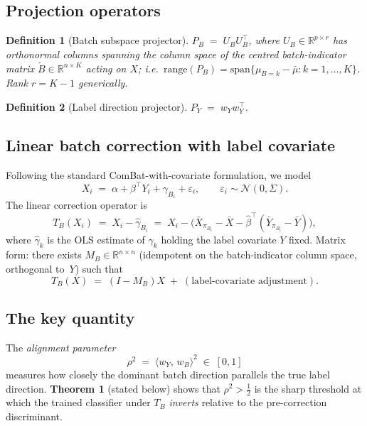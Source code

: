 \documentclass[11pt,a4paper]{article}
\newtheorem{definition}{Definition}
\begin{document}
\subsection{Projection operators}

\begin{definition}[Batch subspace projector]
  $P_B \;=\; U_B U_B^{\!\top}$, where $U_B\in\mathbb{R}^{p\times r}$
  has orthonormal columns spanning the column space of the centred
  batch-indicator matrix $\tilde B\in\mathbb{R}^{n\times K}$ acting on
  $X$; i.e.\ $\mathrm{range}(P_B)=\mathrm{span}\{\mu_{B=k}-\bar\mu:k=1,\dots,K\}$.
  Rank $r = K-1$ generically.
\end{definition}

\begin{definition}[Label direction projector]
  $P_Y \;=\; w_Y w_Y^{\!\top}$.
\end{definition}

\subsection{Linear batch correction with label covariate}

Following the standard ComBat-with-covariate formulation, we model
\begin{equation}
   X_i \;=\; \alpha + \beta^{\!\top} Y_i + \gamma_{B_i} + \varepsilon_i,
   \qquad \varepsilon_i\sim\mathcal{N}(0,\Sigma).
   \label{eq:additive-model}
\end{equation}
The linear correction operator is
\begin{equation}
  T_B(X_i) \;=\; X_i - \hat\gamma_{B_i}
  \;=\; X_i - \bigl(\bar X_{\pi_{B_i}} - \bar X - \hat\beta^{\!\top}(\bar Y_{\pi_{B_i}}-\bar Y)\bigr),
  \label{eq:TB}
\end{equation}
where $\hat\gamma_k$ is the OLS estimate of $\gamma_k$ holding the label
covariate $Y$ fixed. Matrix form: there exists $M_B\in\mathbb{R}^{n\times n}$
(idempotent on the batch-indicator column space, orthogonal to~$Y$) such that
\begin{equation}
  T_B(X) \;=\; (I-M_B)X \;+\; (\text{label-covariate adjustment}).
  \label{eq:TB-matrix}
\end{equation}

\subsection{The key quantity}

The \emph{alignment parameter}
\begin{equation}
  \rho^{2} \;=\; \bigl\langle w_Y,\,w_B\bigr\rangle^{2}
  \;\in\;[0,1]
  \label{eq:rho}
\end{equation}
measures how closely the dominant batch direction parallels the true
label direction.  \textbf{Theorem 1} (stated below) shows that
$\rho^2>\tfrac12$ is the sharp threshold at which the trained classifier
under $T_B$ \emph{inverts} relative to the pre-correction discriminant.
\end{document}
